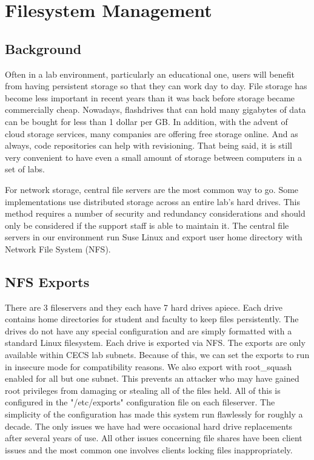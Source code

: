 \section{Filesystem Management} \label{sec:filesystem_management}
\subsection{Background}
Often in a lab environment, particularly an educational one, users will benefit from having persistent storage so that they can work day to day.   File storage has become less important in recent years than it was back before storage became commercially cheap.  Nowadays, flashdrives that can hold many gigabytes of data can be bought for less than 1 dollar per GB.  In addition, with the advent of cloud storage services, many companies are offering free storage online.  And as always, code repositories can help with revisioning.   That being said, it is still very convenient to have even a small amount of storage between computers in a set of labs.  

For network storage, central file servers are the most common way to go.  Some implementations use distributed storage across an entire lab's hard drives.  This method requires a number of security and redundancy considerations and should only be considered if the support staff is able to maintain it.  The central file servers in our environment run Suse Linux and export user home directory with Network File System (NFS).  
\subsection{NFS Exports}
There are 3 fileservers and they each have 7 hard drives apiece.  Each drive contains home directories for student and faculty to keep files persistently.  The drives do not have any special configuration and are simply formatted with a standard Linux filesystem.  Each drive is exported via NFS.  The exports are only available within CECS lab subnets.  Because of this, we can set the exports to run in insecure mode for compatibility reasons.  We also export with root\_squash enabled for all but one subnet.  This prevents an attacker who may have gained root privileges from damaging or stealing all of the files held.  All of this is configured in the "/etc/exports" configuration file on each fileserver.  The simplicity of the configuration has made this system run flawlessly for roughly a decade.  The only issues we have had were occasional hard drive replacements after several years of use.  All other issues concerning file shares have been client issues and the most common one involves clients locking files inappropriately.  
